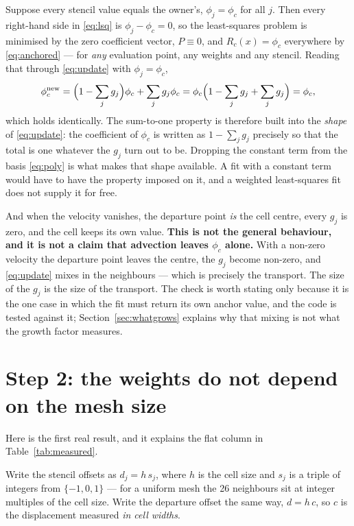 \documentclass[11pt,a4paper]{article}
\begin{document}
Suppose every stencil value equals the owner's, \(\phi_j = \phi_c\) for all \(j\). Then every
right-hand side in \eqref{eq:lsq} is \(\phi_j - \phi_c = 0\), so the least-squares problem is
minimised by the zero coefficient vector, \(P \equiv 0\), and \(R_c(x) = \phi_c\) everywhere by
\eqref{eq:anchored} --- for \emph{any} evaluation point, any weights and any stencil. Reading
that through \eqref{eq:update} with \(\phi_j = \phi_c\),
\[
  \phi_c^{\text{new}} = \Bigl(1-\sum_j g_j\Bigr)\phi_c + \sum_j g_j \phi_c
  = \phi_c\Bigl(1 - \sum_j g_j + \sum_j g_j\Bigr) = \phi_c ,
\]
which holds identically. The sum-to-one property is therefore built into the \emph{shape} of
\eqref{eq:update}: the coefficient of \(\phi_c\) is written as \(1 - \sum_j g_j\) precisely so
that the total is one whatever the \(g_j\) turn out to be. Dropping the constant term from the
basis \eqref{eq:poly} is what makes that shape available. A fit with a constant term would have
to have the property imposed on it, and a weighted least-squares fit does not supply it for
free.

And when the velocity vanishes, the departure point \emph{is} the cell centre, every $g_j$ is
zero, and the cell keeps its own value. \textbf{This is not the general behaviour, and it is not
a claim that advection leaves $\phi_c$ alone.} With a non-zero velocity the departure point
leaves the centre, the $g_j$ become non-zero, and \eqref{eq:update} mixes in the neighbours ---
which is precisely the transport. The size of the $g_j$ is the size of the transport. The check
is worth stating only because it is the one case in which the fit must return its own anchor
value, and the code is tested against it; Section~\ref{sec:whatgrows} explains why that mixing
is not what the growth factor measures.

\section{Step 2: the weights do not depend on the mesh size}
\label{sec:scaling}

Here is the first real result, and it explains the flat column in
Table~\ref{tab:measured}.

Write the stencil offsets as $d_j = h\, s_j$, where $h$ is the cell size and $s_j$ is a
triple of integers from $\{-1,0,1\}$ --- for a uniform mesh the 26 neighbours sit at integer
multiples of the cell size. Write the departure offset the same way, $d = h\,c$, so $c$ is
the displacement measured \emph{in cell widths}.
\end{document}
